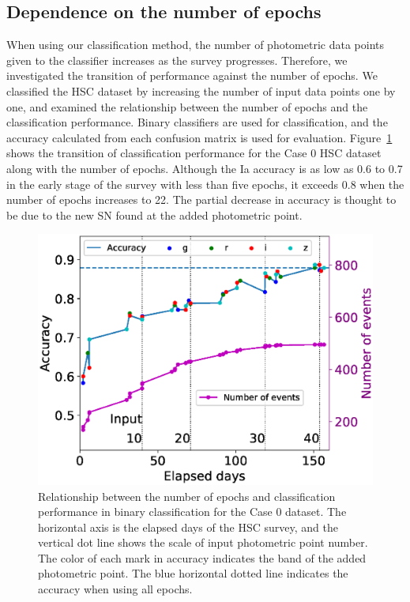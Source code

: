 \documentclass[useamsfonts]{pasj01}
\begin{document}
\subsection{Dependence on the number of epochs}
%
When using our classification method, the number of photometric data points given to the classifier increases as the survey progresses.
Therefore, we investigated the transition of performance against the number of epochs.
We classified the HSC dataset by increasing the number of input data points one by one, and examined the relationship between the number of epochs and the classification performance.
Binary classifiers are used for classification, and the accuracy calculated from each confusion matrix is used for evaluation.
Figure\ \ref{fig:n_observations} shows the transition of classification performance for the Case 0 HSC dataset along with the number of epochs.
Although the Ia accuracy is as low as 0.6 to 0.7 in the early stage of the survey with less than five epochs, it exceeds 0.8 when the number of epochs increases to 22.
The partial decrease in accuracy is thought to be due to the new SN found at the added photometric point.
%
\begin{figure}[htbp]
  \begin{center}
     \includegraphics[width=\columnwidth]{figures/n_observations_v2_case0.eps}
  \end{center}
  \caption{%
  Relationship between the number of epochs and classification performance in binary classification for the Case 0 dataset. 
  The horizontal axis is the elapsed days of the HSC survey, and the vertical dot line shows the scale of input photometric point number. 
  The color of each mark in accuracy indicates the band of the added photometric point. 
  The blue horizontal dotted line indicates the accuracy when using all epochs.
  }%
  \label{fig:n_observations}
\end{figure}
%
\end{document}
